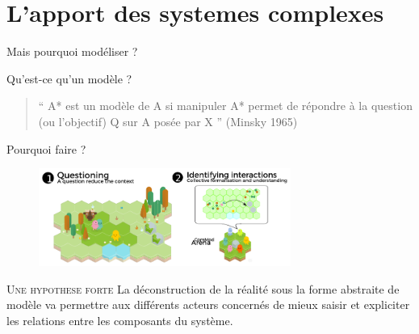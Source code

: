 \documentclass[newPxFont]{beamer}
\begin{document}

\section{L'apport des systemes complexes}

\begin{frame}[c]{Mais pourquoi modéliser ?}
  \vspace{-1cm}
  
  Qu'est-ce qu'un modèle ?
  \begin{quotation}
    `` A* est un modèle de A si manipuler A* permet de répondre à la question (ou l'objectif) Q sur A posée par X '' (Minsky 1965)
  \end{quotation}
  
  Pourquoi faire ?
  \vspace{-0.4cm}
  \begin{figure}
    \includegraphics[height=3.2cm]{img/modeliser.png}
  \end{figure}
  
  \small{
    \begin{alertblock}{\textsc{Une hypothese forte}}
      La déconstruction de la réalité sous la forme abstraite de modèle va permettre aux différents acteurs concernés de mieux saisir et expliciter les relations entre les composants du système.
    \end{alertblock}
  }
  \end{frame}
  
\end{document}
